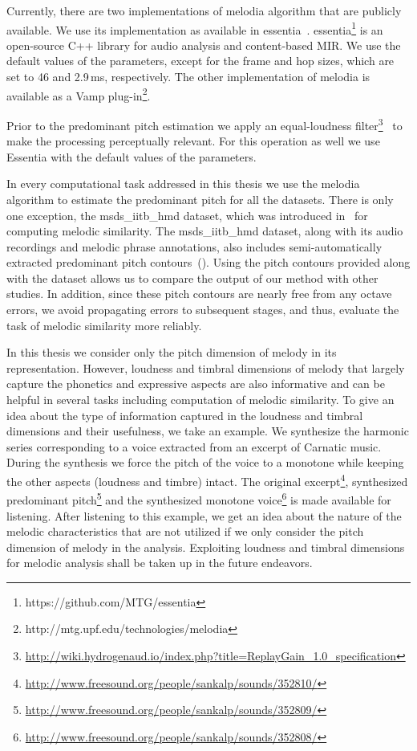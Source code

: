 {Currently, there are two implementations of \gls{melodia} algorithm that are publicly available. We use its implementation as available in \Gls{essentia}~\citep{essentia}. \Gls{essentia}\footnote{https://github.com/MTG/essentia} is an open-source C++ library for audio analysis and content-based MIR. We use the default values of the parameters, except for the frame and hop sizes, which are set to 46 and 2.9\,ms, respectively. The other implementation of \Gls{melodia} is available as a Vamp plug-in\footnote{http://mtg.upf.edu/technologies/melodia}. 

Prior to the predominant pitch estimation we apply an equal-loudness filter\footnote{\url{http://wiki.hydrogenaud.io/index.php?title=ReplayGain_1.0_specification}}~\citep{essentia} to make the processing perceptually relevant. For this operation as well we use Essentia with the default values of the parameters. 

In every computational task addressed in this thesis we use the \Gls{melodia} algorithm to estimate the predominant pitch for all the datasets. There is only one exception, the \acrshort{msds_iitb_hmd} dataset, which was introduced in~\cite{Ross2012b} for computing melodic similarity. The \acrshort{msds_iitb_hmd} dataset, along with its audio recordings and melodic phrase annotations, also includes semi-automatically extracted predominant pitch contours~(). Using the pitch contours provided along with the dataset allows us to compare the output of our method with other studies. In addition, since these pitch contours are nearly free from any octave errors, we avoid propagating errors to subsequent stages, and thus, evaluate the task of melodic similarity more reliably. 

In this thesis we consider only the pitch dimension of melody in its representation. However, loudness and timbral dimensions of melody that largely capture the phonetics and expressive aspects are also informative and can be helpful in several tasks including computation of melodic similarity. To give an idea about the type of information captured in the loudness and timbral dimensions and their usefulness, we take an example. We synthesize the harmonic series corresponding to a voice extracted from an excerpt of Carnatic music. During the synthesis we force the pitch of the voice to a monotone while keeping the other aspects (loudness and timbre) intact. The original excerpt\footnote{\url{http://www.freesound.org/people/sankalp/sounds/352810/}}, synthesized predominant pitch\footnote{\url{http://www.freesound.org/people/sankalp/sounds/352809/}} and the synthesized monotone voice\footnote{\url{http://www.freesound.org/people/sankalp/sounds/352808/}} is made available for listening. After listening to this example, we get an idea about the nature of the melodic characteristics that are not utilized if we only consider the pitch dimension of melody in the analysis. Exploiting loudness and timbral dimensions for melodic analysis shall be taken up in the future endeavors.


}

